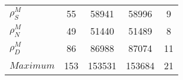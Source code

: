 \begin{center}
\begin{longtable}{lcccc}
$ {\rho^{M}_{S}}       $	 & 	                   55	 & 	                58941	 & 	                58996	 & 	                    9 \\ 
$ {\rho^{M}_{N}}       $	 & 	                   49	 & 	                51440	 & 	                51489	 & 	                    8 \\ 
$ {\rho^{M}_{D}}       $	 & 	                   86	 & 	                86988	 & 	                87074	 & 	                   11 \\ 
$Maximum               $	 & 	                  153	 & 	               153531	 & 	               153684	 & 	                   21 \\ 
\end{longtable}
 \end{center}
